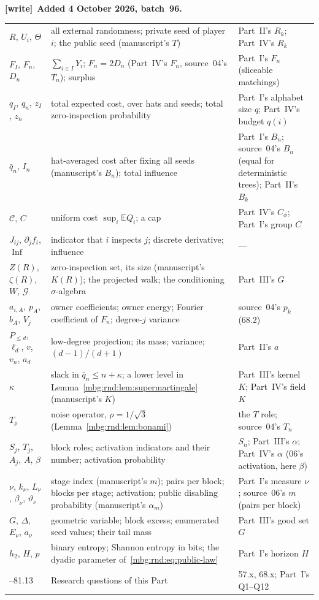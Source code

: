 \documentclass[11pt,letterpaper]{article}
\theoremstyle{definition}
\newcommand{\E}{\mathbb E}
\DeclareMathOperator{\Inf}{Inf}
\newenvironment{writenote}[1][]{\par\smallskip\begingroup\small
 \noindent\textbf{[write]}\if\relax\detokenize{#1}\relax\else~\textbf{#1.}\fi\ }%
 {\par\endgroup\smallskip}
\begin{document}
\begin{writenote}[Added 4 October 2026, batch~96]
\begin{longtable}{>{\raggedright\arraybackslash}p{}>{\raggedright\arraybackslash}p{}>{\raggedright\arraybackslash}p{}}
$R$, $U_i$, $\Theta$ & all external randomness; private seed of player~$i$; the public seed (manuscript's $T$) & Part~II's $R_k$; Part~IV's $R_k$\\
$F_I$, $F_n$, $D_n$ & $\sum_{i\in I}Y_i$; $F_n=2D_n$ (Part~IV's $F_n$, source~04's $T_n$); surplus & Part~I's $F_n$ (sliceable matchings)\\
$q_I$, $q_n$, $z_I$, $z_n$ & total expected cost, over hats and seeds; total zero-inspection probability & Part~I's alphabet size $q$; Part~IV's budget $q(i)$\\
$\bar q_n$, $I_n$ & hat-averaged cost after fixing all seeds (manuscript's $B_n$); total influence & Part~I's $B_n$; source~04's $B_n$ (equal for deterministic trees); Part~II's $B_k$\\
$\mathcal C$, $C$ & uniform cost $\sup_i\E Q_i$; a cap & Part~IV's $C_\phi$; Part~I's group $C$\\
$J_{ij}$, $\partial_jf_i$, $\Inf$ & indicator that $i$ inspects $j$; discrete derivative; influence & ---\\
$Z(R)$, $\zeta(R)$, $W$, $\mathcal G$ & zero-inspection set, its size (manuscript's $K(R)$); the projected walk; the conditioning $\sigma$-algebra & Part~III's $G$\\
$a_{i,A}$, $p_A$, $b_A$, $V_j$ & owner coefficients; owner energy; Fourier coefficient of $F_n$; degree-$j$ variance & source~04's $p_k$ (68.2)\\
$P_{\le d}$, $\ell_d$, $v$, $v_n$, $a_d$ & low-degree projection; its mass; variance; $(d-1)/(d+1)$ & Part~II's $a$\\
$\kappa$ & slack in $\bar q_n\le n+\kappa$; a lower level in Lemma~\ref{mbg:rnd:lem:supermartingale} (manuscript's $K$) & Part~III's kernel $K$; Part~IV's field $K$\\
$T_\rho$ & noise operator, $\rho=1/\sqrt3$ (Lemma~\ref{mbg:rnd:lem:bonami}) & the $T$ role; source~04's $T_n$\\
$S_j$, $T_j$, $A_j$, $A$, $\beta$ & block roles; activation indicators and their number; activation probability & $S_n$; Part~III's $\alpha$; Part~IV's $\alpha$ (06's activation, here $\beta$)\\
$\nu$, $k_\nu$, $L_\nu$, $\beta_\nu$, $\vartheta_\nu$ & stage index (manuscript's $m$); pairs per block; blocks per stage; activation; public disabling probability (manuscript's $\alpha_m$) & Part~I's measure $\nu$; source~06's $m$ (pairs per block)\\
$G$, $\Delta$, $E_\nu$, $a_\nu$ & geometric variable; block excess; enumerated seed values; their tail mass & Part~III's good set $G$\\
$h_2$, $H$, $p$ & binary entropy; Shannon entropy in bits; the dyadic parameter of~\eqref{mbg:rnd:eq:public-law} & Part~I's horizon $H$\\
81.1--81.13 & Research questions of this Part & 57.x, 68.x; Part~I's Q1--Q12\\
\bottomrule
\end{longtable}
\end{writenote}
\end{document}

